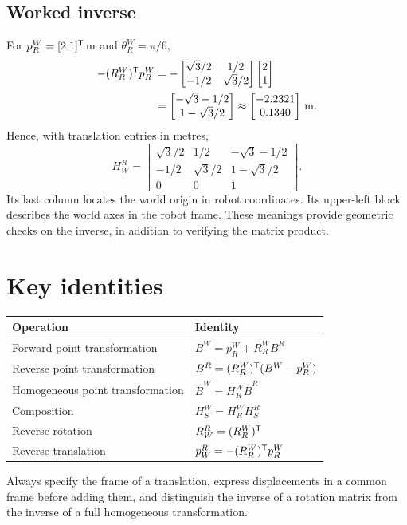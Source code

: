 \subsection{Worked inverse}
For $p_R^W=[2\;1]^{\mathsf T}\,\mathrm{m}$ and $\theta_R^W=\pi/6$,
\begin{align*}
 -(R_R^W)^{\mathsf T} p_R^W
 &=-\begin{bmatrix}\sqrt3/2&1/2\\-1/2&\sqrt3/2\end{bmatrix}
 \begin{bmatrix}2\\1\end{bmatrix}\\
 &=\begin{bmatrix}-\sqrt3-1/2\\1-\sqrt3/2\end{bmatrix}
 \approx\begin{bmatrix}-2.2321\\0.1340\end{bmatrix}\,\mathrm{m}.
\end{align*}
Hence, with translation entries in metres,
\begin{equation}
 H_W^R=\begin{bmatrix}
 \sqrt3/2&1/2&-\sqrt3-1/2\\
 -1/2&\sqrt3/2&1-\sqrt3/2\\
 0&0&1
 \end{bmatrix}.
\end{equation}
Its last column locates the world origin in robot coordinates. Its upper-left
block describes the world axes in the robot frame. These meanings provide
geometric checks on the inverse, in addition to verifying the matrix product.

\section{Key identities}
\begin{center}
\renewcommand{\arraystretch}{1.35}
\begin{tabular}{ll}
\toprule
Operation & Identity \\
\midrule
Forward point transformation & $B^W=p_R^W+R_R^W B^R$ \\
Reverse point transformation & $B^R=(R_R^W)^{\mathsf T}(B^W-p_R^W)$ \\
Homogeneous point transformation & $\widetilde B^W=H_R^W\widetilde B^R$ \\
Composition & $H_S^W=H_R^W H_S^R$ \\
Reverse rotation & $R_W^R=(R_R^W)^{\mathsf T}$ \\
Reverse translation & $p_W^R=-(R_R^W)^{\mathsf T} p_R^W$ \\
\bottomrule
\end{tabular}
\end{center}
Always specify the frame of a translation, express displacements in a common
frame before adding them, and distinguish the inverse of a rotation matrix
from the inverse of a full homogeneous transformation.

